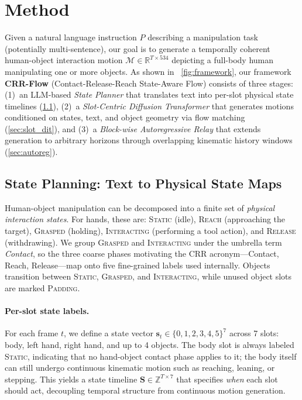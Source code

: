 \documentclass[sigconf, screen, review, anonymous]{acmart}
\begin{document}
\section{Method}
\label{sec:method}

Given a natural language instruction $P$ describing a manipulation task (potentially multi-sentence), our goal is to generate a temporally coherent human-object interaction motion $\mathcal{M} \in \mathbb{R}^{T \times 534}$ depicting a full-body human manipulating one or more objects. As shown in ~\cref{fig:framework}, our framework \textbf{CRR-Flow} (Contact-Release-Reach State-Aware Flow) consists of three stages: (1)~an LLM-based \emph{State Planner} that translates text into per-slot physical state timelines (\cref{sec:state_planner}), (2)~a \emph{Slot-Centric Diffusion Transformer} that generates motions conditioned on states, text, and object geometry via flow matching (\cref{sec:slot_dit}), and (3)~a \emph{Block-wise Autoregressive Relay} that extends generation to arbitrary horizons through overlapping kinematic history windows (\cref{sec:autoreg}).

\subsection{State Planning: Text to Physical State Maps}
\label{sec:state_planner}
Human-object manipulation can be decomposed into a finite set of \emph{physical interaction states}. For hands, these are: \textsc{Static} (idle), \textsc{Reach} (approaching the target), \textsc{Grasped} (holding), \textsc{Interacting} (performing a tool action), and \textsc{Release} (withdrawing). We group \textsc{Grasped} and \textsc{Interacting} under the umbrella term \emph{Contact}, so the three coarse phases motivating the CRR acronym---Contact, Reach, Release---map onto five fine-grained labels used internally. Objects transition between \textsc{Static}, \textsc{Grasped}, and \textsc{Interacting}, while unused object slots are marked \textsc{Padding}.
\paragraph{Per-slot state labels.}
For each frame $t$, we define a state vector $\mathbf{s}_t \in \{0,1,2,3,4,5\}^7$ across 7 slots: body, left hand, right hand, and up to 4 objects. The body slot is always labeled \textsc{Static}, indicating that no hand-object contact phase applies to it; the body itself can still undergo continuous kinematic motion such as reaching, leaning, or stepping. This yields a state timeline $\mathbf{S} \in \mathbb{Z}^{T \times 7}$ that specifies \emph{when} each slot should act, decoupling temporal structure from continuous motion generation.
\end{document}
